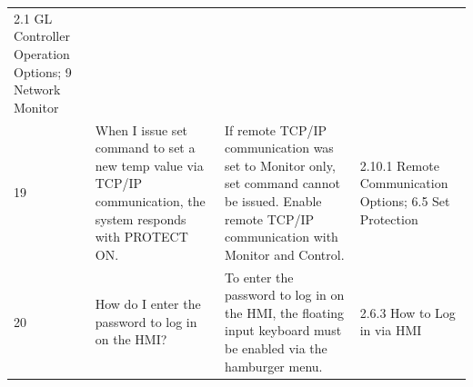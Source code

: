 \begin{longtable}[]{@{}llll@{}}
\begin{minipage}[t]{0.17\columnwidth}
2.1 GL Controller Operation Options; 9 Network Monitor\strut
\end{minipage}\tabularnewline
\begin{minipage}[t]{0.08\columnwidth}\raggedright
19\strut
\end{minipage} & \begin{minipage}[t]{0.30\columnwidth}\raggedright
When I issue set command to set a new temp value via TCP/IP
communication, the system responds with PROTECT ON.\strut
\end{minipage} & \begin{minipage}[t]{0.33\columnwidth}\raggedright
If remote TCP/IP communication was set to Monitor only, set command
cannot be issued. Enable remote TCP/IP communication with Monitor and
Control.\strut
\end{minipage} & \begin{minipage}[t]{0.17\columnwidth}\raggedright
2.10.1 Remote Communication Options; 6.5 Set Protection\strut
\end{minipage}\tabularnewline
\begin{minipage}[t]{0.08\columnwidth}\raggedright
20\strut
\end{minipage} & \begin{minipage}[t]{0.30\columnwidth}\raggedright
How do I enter the password to log in on the HMI?\strut
\end{minipage} & \begin{minipage}[t]{0.33\columnwidth}\raggedright
To enter the password to log in on the HMI, the floating input keyboard
must be enabled via the hamburger menu.\strut
\end{minipage} & \begin{minipage}[t]{0.17\columnwidth}\raggedright
2.6.3 How to Log in via HMI\strut
\end{minipage}\tabularnewline
\bottomrule
\end{longtable}


